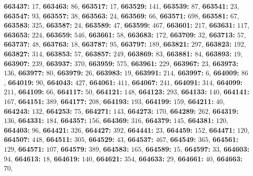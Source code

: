 \textsf{\bfseries 663437:} $17$, \textsf{\bfseries 663463:} $86$, \textsf{\bfseries 663517:} $17$, \textsf{\bfseries 663529:} $141$, \textsf{\bfseries 663539:} $87$, \textsf{\bfseries 663541:} $23$, \textsf{\bfseries 663547:} $93$, \textsf{\bfseries 663557:} $38$, \textsf{\bfseries 663563:} $24$, \textsf{\bfseries 663569:} $66$, \textsf{\bfseries 663571:} $698$, \textsf{\bfseries 663581:} $67$, \textsf{\bfseries 663583:} $325$, \textsf{\bfseries 663587:} $24$, \textsf{\bfseries 663589:} $47$, \textsf{\bfseries 663599:} $467$, \textsf{\bfseries 663601:} $217$, \textsf{\bfseries 663631:} $117$, \textsf{\bfseries 663653:} $224$, \textsf{\bfseries 663659:} $546$, \textsf{\bfseries 663661:} $58$, \textsf{\bfseries 663683:} $172$, \textsf{\bfseries 663709:} $32$, \textsf{\bfseries 663713:} $57$, \textsf{\bfseries 663737:} $48$, \textsf{\bfseries 663763:} $18$, \textsf{\bfseries 663787:} $95$, \textsf{\bfseries 663797:} $189$, \textsf{\bfseries 663821:} $297$, \textsf{\bfseries 663823:} $192$, \textsf{\bfseries 663827:} $314$, \textsf{\bfseries 663853:} $57$, \textsf{\bfseries 663857:} $249$, \textsf{\bfseries 663869:} $83$, \textsf{\bfseries 663881:} $84$, \textsf{\bfseries 663893:} $19$, \textsf{\bfseries 663907:} $239$, \textsf{\bfseries 663937:} $370$, \textsf{\bfseries 663959:} $575$, \textsf{\bfseries 663961:} $229$, \textsf{\bfseries 663967:} $23$, \textsf{\bfseries 663973:} $136$, \textsf{\bfseries 663977:} $80$, \textsf{\bfseries 663979:} $26$, \textsf{\bfseries 663983:} $19$, \textsf{\bfseries 663991:} $214$, \textsf{\bfseries 663997:} $6$, \textsf{\bfseries 664009:} $86$, \textsf{\bfseries 664019:} $90$, \textsf{\bfseries 664043:} $427$, \textsf{\bfseries 664061:} $411$, \textsf{\bfseries 664067:} $241$, \textsf{\bfseries 664091:} $314$, \textsf{\bfseries 664099:} $211$, \textsf{\bfseries 664109:} $66$, \textsf{\bfseries 664117:} $50$, \textsf{\bfseries 664121:} $148$, \textsf{\bfseries 664123:} $293$, \textsf{\bfseries 664133:} $140$, \textsf{\bfseries 664141:} $167$, \textsf{\bfseries 664151:} $389$, \textsf{\bfseries 664177:} $208$, \textsf{\bfseries 664193:} $193$, \textsf{\bfseries 664199:} $159$, \textsf{\bfseries 664211:} $40$, \textsf{\bfseries 664243:} $132$, \textsf{\bfseries 664253:} $75$, \textsf{\bfseries 664271:} $143$, \textsf{\bfseries 664273:} $170$, \textsf{\bfseries 664289:} $262$, \textsf{\bfseries 664319:} $136$, \textsf{\bfseries 664331:} $184$, \textsf{\bfseries 664357:} $156$, \textsf{\bfseries 664369:} $316$, \textsf{\bfseries 664379:} $145$, \textsf{\bfseries 664381:} $120$, \textsf{\bfseries 664403:} $96$, \textsf{\bfseries 664421:} $326$, \textsf{\bfseries 664427:} $392$, \textsf{\bfseries 664441:} $23$, \textsf{\bfseries 664459:} $152$, \textsf{\bfseries 664471:} $120$, \textsf{\bfseries 664507:} $448$, \textsf{\bfseries 664511:} $305$, \textsf{\bfseries 664529:} $43$, \textsf{\bfseries 664537:} $467$, \textsf{\bfseries 664549:} $365$, \textsf{\bfseries 664561:} $129$, \textsf{\bfseries 664571:} $107$, \textsf{\bfseries 664579:} $389$, \textsf{\bfseries 664583:} $165$, \textsf{\bfseries 664589:} $15$, \textsf{\bfseries 664597:} $33$, \textsf{\bfseries 664603:} $94$, \textsf{\bfseries 664613:} $18$, \textsf{\bfseries 664619:} $140$, \textsf{\bfseries 664621:} $354$, \textsf{\bfseries 664633:} $29$, \textsf{\bfseries 664661:} $40$, \textsf{\bfseries 664663:} $70$, 

